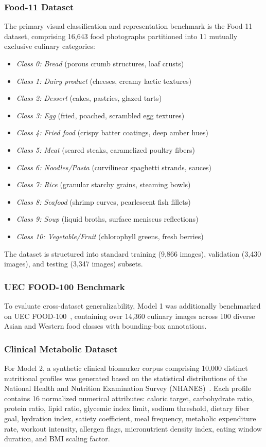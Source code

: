 \documentclass[10pt,journal,compsoc]{IEEEtran}
\begin{document}
\subsubsection{Food-11 Dataset}
The primary visual classification and representation benchmark is the Food-11 dataset, comprising 16,643 food photographs partitioned into 11 mutually exclusive culinary categories:
\begin{itemize}
    \item \textit{Class 0: Bread} (porous crumb structures, loaf crusts)
    \item \textit{Class 1: Dairy product} (cheeses, creamy lactic textures)
    \item \textit{Class 2: Dessert} (cakes, pastries, glazed tarts)
    \item \textit{Class 3: Egg} (fried, poached, scrambled egg textures)
    \item \textit{Class 4: Fried food} (crispy batter coatings, deep amber hues)
    \item \textit{Class 5: Meat} (seared steaks, caramelized poultry fibers)
    \item \textit{Class 6: Noodles/Pasta} (curvilinear spaghetti strands, sauces)
    \item \textit{Class 7: Rice} (granular starchy grains, steaming bowls)
    \item \textit{Class 8: Seafood} (shrimp curves, pearlescent fish fillets)
    \item \textit{Class 9: Soup} (liquid broths, surface meniscus reflections)
    \item \textit{Class 10: Vegetable/Fruit} (chlorophyll greens, fresh berries)
\end{itemize}
The dataset is structured into standard training (9,866 images), validation (3,430 images), and testing (3,347 images) subsets.

\subsubsection{UEC FOOD-100 Benchmark}
To evaluate cross-dataset generalizability, Model 1 was additionally benchmarked on UEC FOOD-100~\cite{matsuda2012}, containing over 14,360 culinary images across 100 diverse Asian and Western food classes with bounding-box annotations.

\subsubsection{Clinical Metabolic Dataset}
For Model 2, a synthetic clinical biomarker corpus comprising 10,000 distinct nutritional profiles was generated based on the statistical distributions of the National Health and Nutrition Examination Survey (NHANES)~\cite{freedman2018}. Each profile contains 16 normalized numerical attributes: caloric target, carbohydrate ratio, protein ratio, lipid ratio, glycemic index limit, sodium threshold, dietary fiber goal, hydration index, satiety coefficient, meal frequency, metabolic expenditure rate, workout intensity, allergen flags, micronutrient density index, eating window duration, and BMI scaling factor.
\end{document}
